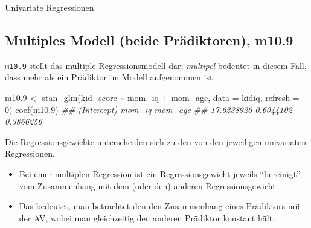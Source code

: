 \documentclass[
  a4paper,
  DIV=11]{scrreprt}
\newenvironment{Shaded}{\begin{snugshade}}{\end{snugshade}}
\newcommand{\AttributeTok}[1]{\textcolor[rgb]{0.40,0.45,0.13}{#1}}
\newcommand{\DecValTok}[1]{\textcolor[rgb]{0.68,0.00,0.00}{#1}}
\newcommand{\DocumentationTok}[1]{\textcolor[rgb]{0.37,0.37,0.37}{\textit{#1}}}
\newcommand{\FloatTok}[1]{\textcolor[rgb]{0.68,0.00,0.00}{#1}}
\newcommand{\FunctionTok}[1]{\textcolor[rgb]{0.28,0.35,0.67}{#1}}
\newcommand{\NormalTok}[1]{\textcolor[rgb]{0.00,0.23,0.31}{#1}}
\newcommand{\OtherTok}[1]{\textcolor[rgb]{0.00,0.23,0.31}{#1}}
\newcommand{\SpecialCharTok}[1]{\textcolor[rgb]{0.37,0.37,0.37}{#1}}
\providecommand{\tightlist}{%
  \setlength{\itemsep}{0pt}\setlength{\parskip}{0pt}}\usepackage{longtable,booktabs,array}
\theoremstyle{definition}
\theoremstyle{remark}
\begin{document}
Univariate Regressionen

\hypertarget{multiples-modell-beide-pruxe4diktoren-m10.9}{%
\subsection{Multiples Modell (beide Prädiktoren),
m10.9}\label{multiples-modell-beide-pruxe4diktoren-m10.9}}

\texttt{m10.9} stellt das multiple Regressionsmodell dar;
\emph{multipel} bedeutet in diesem Fall, dass mehr als ein Prädiktor im
Modell aufgenommen ist.

\begin{Shaded}
\begin{Highlighting}[]
\NormalTok{m10}\FloatTok{.9} \OtherTok{\textless{}{-}} \FunctionTok{stan\_glm}\NormalTok{(kid\_score }\SpecialCharTok{\textasciitilde{}}\NormalTok{ mom\_iq }\SpecialCharTok{+}\NormalTok{ mom\_age, }
                  \AttributeTok{data =}\NormalTok{ kidiq, }
                  \AttributeTok{refresh =} \DecValTok{0}\NormalTok{)}
\FunctionTok{coef}\NormalTok{(m10}\FloatTok{.9}\NormalTok{)}
\DocumentationTok{\#\# (Intercept)      mom\_iq     mom\_age }
\DocumentationTok{\#\#  17.6238926   0.6044102   0.3866256}
\end{Highlighting}
\end{Shaded}

\begin{tcolorbox}[enhanced jigsaw, title=\textcolor{quarto-callout-important-color}{\faExclamation}\hspace{0.5em}{Wichtig}, bottomtitle=1mm, bottomrule=.15mm, titlerule=0mm, colbacktitle=quarto-callout-important-color!10!white, colframe=quarto-callout-important-color-frame, leftrule=.75mm, left=2mm, toprule=.15mm, colback=white, arc=.35mm, breakable, toptitle=1mm, opacityback=0, rightrule=.15mm, coltitle=black, opacitybacktitle=0.6]

Die Regressionsgewichte unterscheiden sich zu den von den jeweiligen
univariaten Regressionen.

\end{tcolorbox}

\begin{itemize}
\tightlist
\item
  Bei einer multiplen Regression ist ein Regressionsgewicht jeweils
  ``bereinigt'' vom Zusammenhang mit dem (oder den) anderen
  Regressionsgewicht.
\item
  Das bedeutet, man betrachtet den den Zusammenhang eines Prädiktors mit
  der AV, wobei man gleichzeitig den anderen Prädiktor konstant hält.
\end{itemize}
\end{document}
